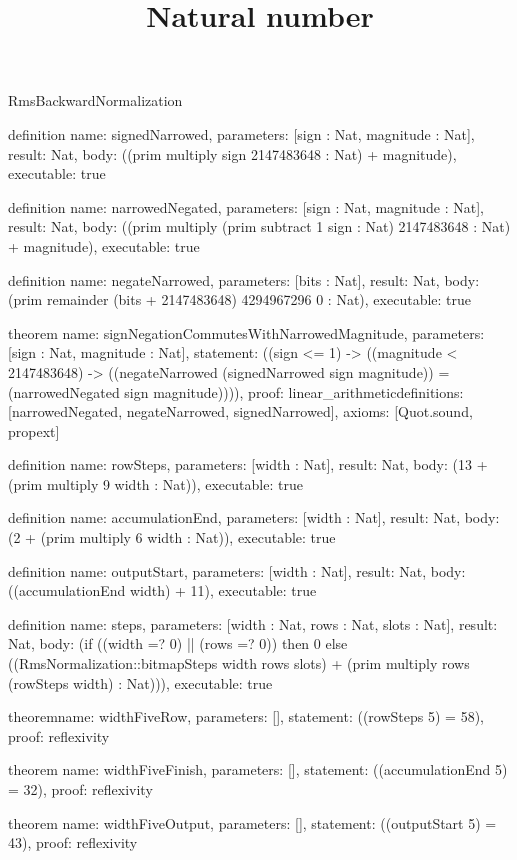 \begin{lexlean}{RmsBackwardNormalization}
\title{Natural number}
\begin{semanticmodule}
definition{
  name: signedNarrowed,
  parameters: [sign : Nat, magnitude : Nat],
  result: Nat,
  body: ((prim multiply sign 2147483648 : Nat) + magnitude),
  executable: true
}

definition{
  name: narrowedNegated,
  parameters: [sign : Nat, magnitude : Nat],
  result: Nat,
  body: ((prim multiply (prim subtract 1 sign : Nat) 2147483648 : Nat) + magnitude),
  executable: true
}

definition{
  name: negateNarrowed,
  parameters: [bits : Nat],
  result: Nat,
  body: (prim remainder (bits + 2147483648) 4294967296 0 : Nat),
  executable: true
}

theorem{
  name: signNegationCommutesWithNarrowedMagnitude,
  parameters: [sign : Nat, magnitude : Nat],
  statement: ((sign <= 1) -> ((magnitude < 2147483648) -> ((negateNarrowed (signedNarrowed sign magnitude)) = (narrowedNegated sign magnitude)))),
  proof: linear_arithmetic{definitions: [narrowedNegated, negateNarrowed, signedNarrowed]},
  axioms: [Quot.sound, propext]
}

definition{
  name: rowSteps,
  parameters: [width : Nat],
  result: Nat,
  body: (13 + (prim multiply 9 width : Nat)),
  executable: true
}

definition{
  name: accumulationEnd,
  parameters: [width : Nat],
  result: Nat,
  body: (2 + (prim multiply 6 width : Nat)),
  executable: true
}

definition{
  name: outputStart,
  parameters: [width : Nat],
  result: Nat,
  body: ((accumulationEnd width) + 11),
  executable: true
}

definition{
  name: steps,
  parameters: [width : Nat, rows : Nat, slots : Nat],
  result: Nat,
  body: (if ((width =? 0) || (rows =? 0)) then 0 else ((RmsNormalization::bitmapSteps width rows slots) + (prim multiply rows (rowSteps width) : Nat))),
  executable: true
}

theorem{name: widthFiveRow, parameters: [], statement: ((rowSteps 5) = 58), proof: reflexivity{}}

theorem{
  name: widthFiveFinish,
  parameters: [],
  statement: ((accumulationEnd 5) = 32),
  proof: reflexivity{}
}

theorem{
  name: widthFiveOutput,
  parameters: [],
  statement: ((outputStart 5) = 43),
  proof: reflexivity{}
}


\end{semanticmodule}
\end{lexlean}
